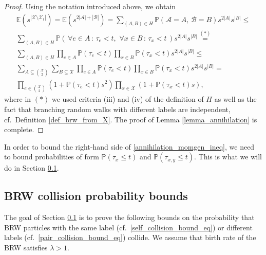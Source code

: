 \documentclass[a4paper,12pt]{article}
\begin{document}
\begin{proof}
Using the notation introduced above, we obtain
\begin{multline}
\mathbb{E}\left( s^{|\mathcal{X} \setminus \mathcal{X}_t|} \right)=\mathbb{E}\left(s^{2|\mathcal{A}|+|\mathcal{B}|} \right)  = \sum_{(A,B)\in H} \mathbb{P}(\mathcal{A}=A, \, \mathcal{B}=B)  s^{2|A|} s^{|B|} \leq \\
\sum_{(A,B)\in H} \mathbb{P}(\, \forall e \in A \, : \, \tau_e<t, \,\, \forall x \in B \, : \, \tau_x <t \, )  s^{2|A|} s^{|B|}\stackrel{(*)}{=}\\
\sum_{(A,B)\in H} \prod_{e \in A} \mathbb{P}( \tau_e<t) \prod_{x \in B} \mathbb{P}( \tau_x <t )  s^{2|A|} s^{|B|} \leq \\
\sum_{ A \subseteq \binom{\mathcal{X}}{2} } \sum_{B \subseteq \mathcal{X} } \prod_{e \in A} \mathbb{P}( \tau_e<t) \prod_{x \in B} \mathbb{P}( \tau_x <t )  s^{2|A|} s^{|B|}=\\
 \prod_{e \in \binom{\mathcal{X}}{2}} \left( 1+ \mathbb{P}(\tau_{e} < t ) s^2 \right)  \prod_{ x \in \mathcal{X} } \left( 1+ \mathbb{P}(\tau_{x} < t )s \right),
\end{multline}
where in $(*)$ we used criteria (iii) and (iv) of the definition of $H$ as well as the fact that branching random walks with different labels are independent, cf.\
Definition \ref{def_brw_from_X}. The proof of Lemma \ref{lemma_annihilation} is complete.
\end{proof}

In order to bound the right-hand side of \eqref{annihilation_momgen_ineq}, we need to bound  probabilities of form $\mathbb{P}(\tau_{x} \leq t )$ and $\mathbb{P}(\tau_{x,y} \leq t )$. This is what we will do in Section \ref{subsection_brw_estimates}.




\subsection{BRW collision probability bounds}
\label{subsection_brw_estimates}


The goal of Section \ref{subsection_brw_estimates} is to prove the following bounds on the probability that BRW particles with the same label (cf.\ \eqref{self_collision_bound_eq}) or different labels (cf.\ \eqref{pair_collision_bound_eq}) collide. We assume that birth rate of the BRW satisfies $\lambda>1$.
\end{document}
